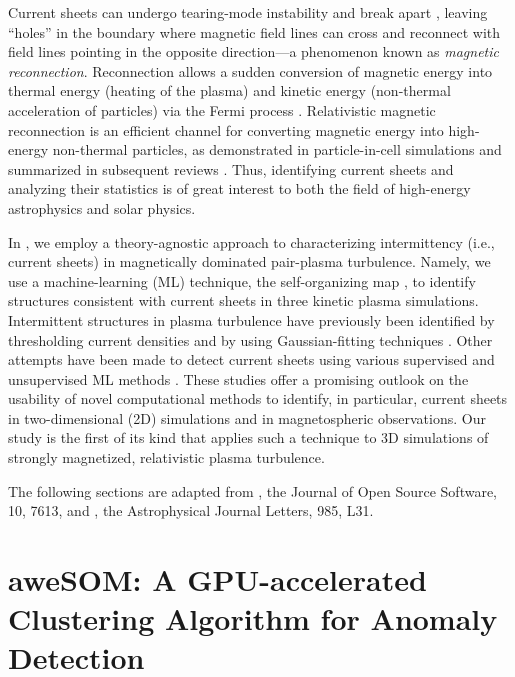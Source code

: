 Current sheets can undergo tearing-mode instability and break apart \citep[e.g.,][]{loureiro_instability_2007,galishnikova_tearing_2022}, leaving ``holes'' in the boundary where magnetic field lines can cross and reconnect with field lines pointing in the opposite direction---a phenomenon known as \textit{magnetic reconnection}.
Reconnection allows a sudden conversion of magnetic energy into thermal energy (heating of the plasma) and kinetic energy (non-thermal acceleration of particles) via the Fermi process \citep[see, e.g.,][]{priest_magnetic_2000}.
Relativistic magnetic reconnection is an efficient channel for converting magnetic energy into high-energy non-thermal particles, as demonstrated in particle-in-cell simulations and summarized in subsequent reviews \citep{sironi_relativistic_2014,kagan_relativistic_2015}.
Thus, identifying current sheets and analyzing their statistics is of great interest to both the field of high-energy astrophysics and solar physics.

In \citet[][]{ha_machine_2025}, we employ a theory-agnostic approach to characterizing intermittency (i.e., current sheets) in magnetically dominated pair-plasma turbulence.
Namely, we use a machine-learning (ML) technique, the self-organizing map \citep[SOM,][]{kohonen_self-organizing_1990}, to identify structures consistent with current sheets in three kinetic plasma simulations.
Intermittent structures in plasma turbulence have previously been identified by thresholding current densities \citep{zhdankin_statistical_2013} and by using Gaussian-fitting techniques \citep{greco_statistical_2009}.
Other attempts have been made to detect current sheets using various supervised and unsupervised ML methods \citep[e.g.,][]{hu_identifying_2020,sisti_detecting_2021,bussov_maarja_segmentation_2021,kohne_unsupervised_2023, edmond_clustering_2024}.
These studies offer a promising outlook on the usability of novel computational methods to identify, in particular, current sheets in two-dimensional (2D) simulations and in magnetospheric observations.
Our study is the first of its kind that applies such a technique to 3D simulations of strongly magnetized, relativistic plasma turbulence.

The following sections are adapted from \citet{ha_awesom_2025}, the Journal of Open Source Software, 10, 7613, and \citet{ha_machine_2025}, the Astrophysical Journal Letters, 985, L31.

\section{aweSOM: A GPU-accelerated Clustering Algorithm for Anomaly Detection}

